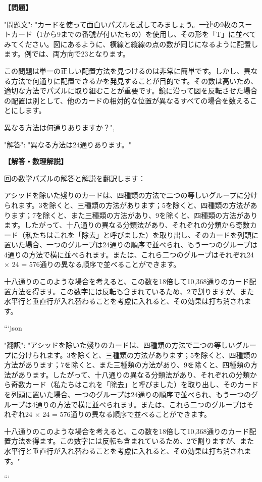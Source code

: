 \documentclass[10pt,a4paper,oneside,openany]{ltjsbook}
\begin{document}
\begin{tcolorbox}[colback=softblue,colframe=primaryblue,title=\textbf{第 383 問：THE "T" CARD PUZZLE.},arc=2mm,boxrule=1pt,breakable]
\textbf{【問題】}\par\vspace{0.3em}
{
"問題文": "カードを使って面白いパズルを試してみましょう。一連の9枚のスートカード（1から9までの番號が付いたもの）を使用し、その形を「T」に並べてみてください。図にあるように、橫線と縦線の点の数が同じになるように配置します。例では、両方向で23となります。

この問題は単一の正しい配置方法を見つけるのは非常に簡単です。しかし、異なる方法で何通りに配置できるかを発見することが目的です。その数は高いため、適切な方法でパズルに取り組むことが重要です。鏡に沿って図を反転させた場合の配置は別として、他のカードの相対的な位置が異なるすべての場合を数えることにします。

異なる方法は何通りありますか？",

"解答": "異なる方法は24通りあります。"
}
\tcblower
\textbf{【解答・数理解説】}\par\vspace{0.3em}
回の数学パズルの解答と解説を翻訳します：

アシッドを除いた殘りのカードは、四種類の方法で二つの等しいグループに分けられます。3を除くと、三種類の方法があります；5を除くと、四種類の方法があります；7を除くと、また三種類の方法があり、9を除くと、四種類の方法があります。したがって、十八通りの異なる分類法があり、それぞれの分類から奇数カード（私たちはこれを「除去」と呼びました）を取り出し、そのカードを列頭に置いた場合、一つのグループは24通りの順序で並べられ、もう一つのグループは4通りの方法で橫に並べられます。または、これら二つのグループはそれぞれ24 × 24 = 576通りの異なる順序で並べることができます。

十八通りのこのような場合を考えると、この数を18倍して10,368通りのカード配置方法を得ます。この数字には反転も含まれているため、2で割りますが、また水平行と垂直行が入れ替わることを考慮に入れると、その効果は打ち消されます。

```json
{
  "翻訳": "アシッドを除いた殘りのカードは、四種類の方法で二つの等しいグループに分けられます。3を除くと、三種類の方法があります；5を除くと、四種類の方法があります；7を除くと、また三種類の方法があり、9を除くと、四種類の方法があります。したがって、十八通りの異なる分類法があり、それぞれの分類から奇数カード（私たちはこれを「除去」と呼びました）を取り出し、そのカードを列頭に置いた場合、一つのグループは24通りの順序で並べられ、もう一つのグループは4通りの方法で橫に並べられます。または、これら二つのグループはそれぞれ24 × 24 = 576通りの異なる順序で並べることができます。

十八通りのこのような場合を考えると、この数を18倍して10,368通りのカード配置方法を得ます。この数字には反転も含まれているため、2で割りますが、また水平行と垂直行が入れ替わることを考慮に入れると、その効果は打ち消されます。"
}
```
\end{tcolorbox}
\end{document}
